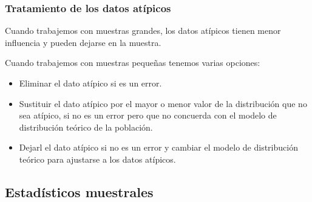 \begin{frame}
\frametitle{Tratamiento de los datos atípicos}
Cuando trabajemos con muestras grandes, los datos atípicos tienen menor influencia y pueden dejarse en la muestra.

Cuando trabajemos con muestras pequeñas tenemos varias opciones:
\begin{itemize}
\item Eliminar el dato atípico si es un error.
\item Sustituir el dato atípico por el mayor o menor valor de la distribución que no sea atípico, si no es un error pero que no concuerda con el modelo de distribución teórico de la población.
\item Dejarl el dato atípico si no es un error y cambiar el modelo de distribución teórico para ajustarse a los datos atípicos.
\end{itemize}
\end{frame}


\subsection{Estadísticos muestrales}

